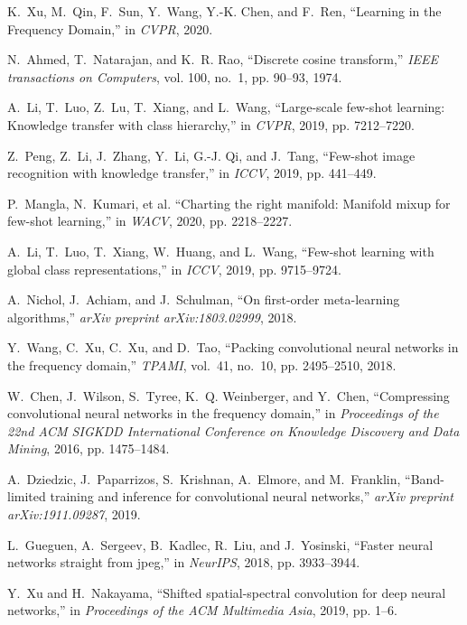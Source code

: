 \documentclass[10pt, conference, compsocconf]{IEEEtran}
\begin{document}
\begin{thebibliography}{10}
K.~Xu, M.~Qin, F.~Sun, Y.~Wang, Y.-K. Chen, and F.~Ren, ``{Learning in the
  Frequency Domain},'' in \emph{CVPR}, 2020.

N.~Ahmed, T.~Natarajan, and K.~R. Rao, ``Discrete cosine transform,''
  \emph{IEEE transactions on Computers}, vol. 100, no.~1, pp. 90--93, 1974.
  
A.~Li, T.~Luo, Z.~Lu, T.~Xiang, and L.~Wang, ``Large-scale few-shot learning:
  Knowledge transfer with class hierarchy,'' in \emph{CVPR}, 2019, pp.
  7212--7220.

Z.~Peng, Z.~Li, J.~Zhang, Y.~Li, G.-J. Qi, and J.~Tang, ``Few-shot image
  recognition with knowledge transfer,'' in \emph{ICCV}, 2019, pp. 441--449.

P.~Mangla, N.~Kumari, et al. ``Charting the right manifold: Manifold mixup for few-shot
  learning,'' in \emph{WACV}, 2020, pp. 2218--2227.

A.~Li, T.~Luo, T.~Xiang, W.~Huang, and L.~Wang, ``Few-shot learning with global
  class representations,'' in \emph{ICCV}, 2019, pp. 9715--9724.

A.~Nichol, J.~Achiam, and J.~Schulman, ``On first-order meta-learning
  algorithms,'' \emph{arXiv preprint arXiv:1803.02999}, 2018.

Y.~Wang, C.~Xu, C.~Xu, and D.~Tao, ``Packing convolutional neural networks in
  the frequency domain,'' \emph{TPAMI}, vol.~41, no.~10, pp. 2495--2510, 2018.

W.~Chen, J.~Wilson, S.~Tyree, K.~Q. Weinberger, and Y.~Chen, ``Compressing
  convolutional neural networks in the frequency domain,'' in \emph{Proceedings
  of the 22nd ACM SIGKDD International Conference on Knowledge Discovery and
  Data Mining}, 2016, pp. 1475--1484.

A.~Dziedzic, J.~Paparrizos, S.~Krishnan, A.~Elmore, and M.~Franklin,
  ``Band-limited training and inference for convolutional neural networks,''
  \emph{arXiv preprint arXiv:1911.09287}, 2019.

L.~Gueguen, A.~Sergeev, B.~Kadlec, R.~Liu, and J.~Yosinski, ``Faster neural
  networks straight from jpeg,'' in \emph{NeurIPS}, 2018, pp. 3933--3944.

Y.~Xu and H.~Nakayama, ``Shifted spatial-spectral convolution for deep neural
  networks,'' in \emph{Proceedings of the ACM Multimedia Asia}, 2019, pp. 1--6.


\end{thebibliography}
\end{document}
